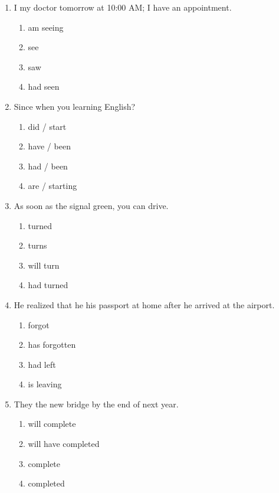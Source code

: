 \documentclass[11pt, a4paper]{article}
\begin{document}
\begin{enumerate}[leftmargin=1.8em, itemsep=10pt]
    \item I \dotfill my doctor tomorrow at 10:00 AM; I have an appointment.
    \begin{enumerate}[label=(\Alph*), itemsep=2pt]
        \item am seeing
        \item see
        \item saw
        \item had seen
    \end{enumerate}

    \item Since when \dotfill you \dotfill learning English?
    \begin{enumerate}[label=(\Alph*), itemsep=2pt]
        \item did / start
        \item have / been
        \item had / been
        \item are / starting
    \end{enumerate}

    \item As soon as the signal \dotfill green, you can drive.
    \begin{enumerate}[label=(\Alph*), itemsep=2pt]
        \item turned
        \item turns
        \item will turn
        \item had turned
    \end{enumerate}

    \item He realized that he \dotfill his passport at home after he arrived at the airport.
    \begin{enumerate}[label=(\Alph*), itemsep=2pt]
        \item forgot
        \item has forgotten
        \item had left
        \item is leaving
    \end{enumerate}

    \item They \dotfill the new bridge by the end of next year.
    \begin{enumerate}[label=(\Alph*), itemsep=2pt]
        \item will complete
        \item will have completed
        \item complete
        \item completed
    \end{enumerate}


\end{enumerate}
\end{document}
